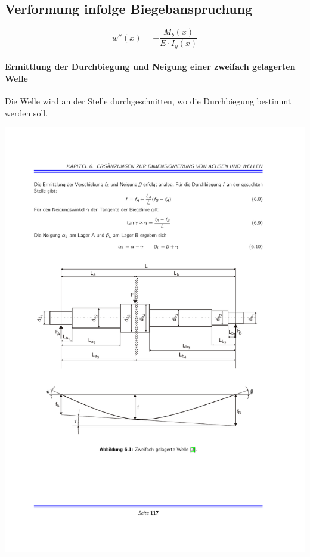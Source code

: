 	\subsection{Verformung infolge Biegebanspruchung} %
		\begin{equation*}
			w''(x) = -\frac{M_b(x)}{E\cdot I_y(x)}
		\end{equation*}
		
		\paragraph{Ermittlung der Durchbiegung und Neigung einer zweifach gelagerten Welle} %
			Die Welle wird an der Stelle durchgeschnitten, wo die Durchbiegung bestimmt werden soll.
			
			\hspace{-.0625\columnwidth}
			\includegraphics[width=1.1\columnwidth]{graphics/welle_durchbiegung}
			
